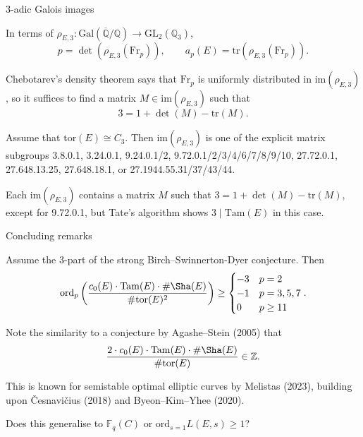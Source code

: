 \documentclass[10pt]{beamer}
\begin{document}
\begin{frame}[t]{3-adic Galois images}

In terms of $ \rho_{E, 3} : \mathrm{Gal}(\overline{\mathbb{Q}} / \mathbb{Q}) \to \mathrm{GL}_2(\mathbb{Q}_3) $,
$$ p = \det(\rho_{E, 3}(\mathrm{Fr}_p)), \qquad a_p(E) = \mathrm{tr}(\rho_{E, 3}(\mathrm{Fr}_p)). $$

\pause

Chebotarev's density theorem says that $ \mathrm{Fr}_p $ is uniformly distributed in $ \mathrm{im}(\rho_{E, 3}) $, so it suffices to find a matrix $ M \in \mathrm{im}(\rho_{E, 3}) $ such that
$$ 3 = 1 + \det(M) - \mathrm{tr}(M). $$

\pause

\begin{theorem}
Assume that $ \mathrm{tor}(E) \cong C_3 $. Then $ \mathrm{im}(\rho_{E, 3}) $ is one of the explicit matrix subgroups 3.8.0.1, 3.24.0.1, 9.24.0.1/2, 9.72.0.1/2/3/4/6/7/8/9/10, 27.72.0.1, 27.648.13.25, 27.648.18.1, or 27.1944.55.31/37/43/44.
\end{theorem}

\pause

\vspace{0.5cm} Each $ \mathrm{im}(\rho_{E, 3}) $ contains a matrix $ M $ such that $ 3 = 1 + \det(M) - \mathrm{tr}(M) $, except for 9.72.0.1, but Tate's algorithm shows $ 3 \mid \mathrm{Tam}(E) $ in this case.

\end{frame}

\begin{frame}[t]{Concluding remarks}

\begin{theorem}[A., 2023]
Assume the $ 3 $-part of the strong Birch--Swinnerton-Dyer conjecture. Then
$$ \mathrm{ord}_p\left(\dfrac{c_0(E) \cdot \mathrm{Tam}(E) \cdot \#\Sha(E)}{\#\mathrm{tor}(E)^2}\right) \ge \begin{cases}
-3 & p = 2 \\
-1 & p = 3, 5, 7 \\
0 & p \ge 11
\end{cases}. $$
\end{theorem}

\pause

Note the similarity to a conjecture by Agashe--Stein (2005) that
$$ \dfrac{2 \cdot c_0(E) \cdot \mathrm{Tam}(E) \cdot \#\Sha(E)}{\#\mathrm{tor}(E)} \in \mathbb{Z}. $$

\pause

This is known for semistable optimal elliptic curves by Melistas (2023), building upon \v Cesnavi\v cius (2018) and Byeon--Kim--Yhee (2020).

\pause

\vspace{0.5cm} Does this generalise to $ \mathbb{F}_q(C) $ or $ \mathrm{ord}_{s = 1} L(E, s) \ge 1 $?

\end{frame}
\end{document}
